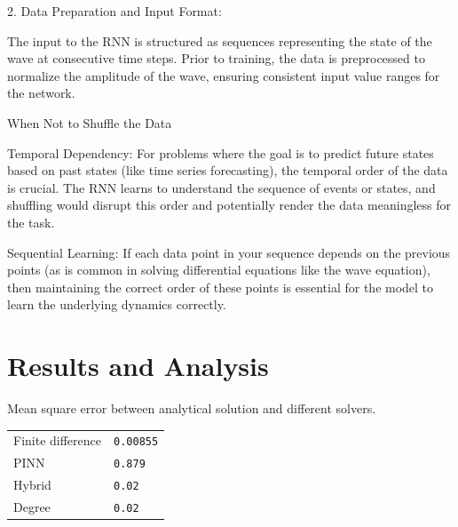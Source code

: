 \documentclass[twoside,11pt]{report}
\begin{document}
    2. Data Preparation and Input Format:

        The input to the RNN is structured as sequences representing the state of the wave at consecutive 
        time steps.
        Prior to training, the data is preprocessed to normalize the amplitude of the wave, ensuring 
        consistent input value ranges for the network.

    When Not to Shuffle the Data

        Temporal Dependency: For problems where the goal is to predict future 
        states based on past states (like time series forecasting), the temporal 
        order of the data is crucial. The RNN learns to understand the sequence of 
        events or states, and shuffling would disrupt this order and potentially render 
        the data meaningless for the task.

        Sequential Learning: If each data point in your sequence depends on the previous 
        points (as is common in solving differential equations like the wave equation), 
        then maintaining the correct order of these points is essential for the model to 
        learn the underlying dynamics correctly.
        \cite{hu2022neuralpde}


\section{Results and Analysis}
\label{sec:resultsdiscussion}

\begin{mytable}[float=!h,label=tab:toyscores, width=0.5\textwidth]{Mean square error between analytical solution and different solvers.}
\centering
\begin{tabular}{l|l}
    Finite difference   &\texttt{0.00855}  \\
    PINN                &\texttt{0.879}  \\
    Hybrid              &\texttt{0.02}  \\
    Degree              &\texttt{0.02}  \\ 
\end{tabular}%
\end{mytable}
    
\end{document}
